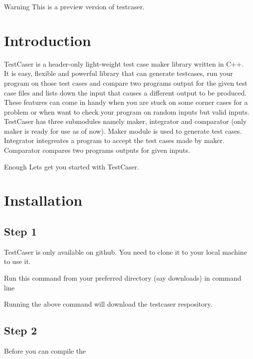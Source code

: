 \begin{DoxyWarning}{Warning}
This is a preview version of testcaser. 
\end{DoxyWarning}
\hypertarget{index_sec_intro}{}\section{Introduction}\label{index_sec_intro}
Test\+Caser is a header-\/only light-\/weight test case maker library written in C++. It is easy, flexible and powerful library that can generate testcases, run your program on those test cases and compare two program\textquotesingle{}s output for the given test case files and lists down the input that causes a different output to be produced. These features can come in handy when you are stuck on some corner cases for a problem or when want to check your program on random inputs but valid inputs. Test\+Caser has three submodules namely maker, integrator and comparator (only maker is ready for use as of now). Maker module is used to generate test cases. Integrator integreates a program to accept the test cases made by maker. Comparator compares two program\textquotesingle{}s outputs for given inputs.

Enough Let\textquotesingle{}s get you started with Test\+Caser.\hypertarget{index_sec_install}{}\section{Installation}\label{index_sec_install}
\hypertarget{index_step1}{}\subsection{Step 1}\label{index_step1}
Test\+Caser is only available on github. You need to clone it to your local machine to use it.

Run this command from your preferred directory (say downloads) in command line 
\begin{DoxyCode}{0}
\end{DoxyCode}
 Running the above command will download the testcaser respository.\hypertarget{index_step2}{}\subsection{Step 2}\label{index_step2}
Before you can compile the 